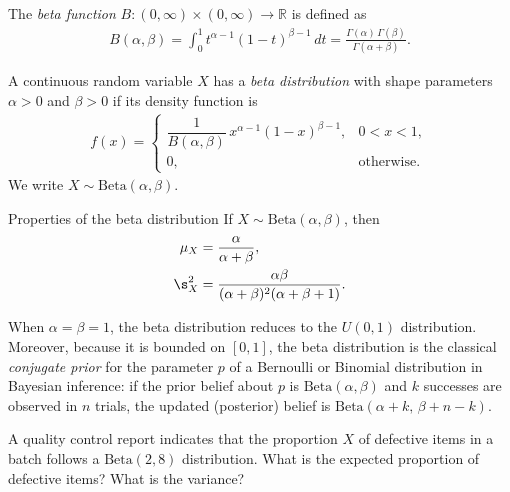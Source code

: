 \begin{definicion}
The \emph{beta function} $B: (0,\infty)\times(0,\infty) \to \mathbb{R}$ is defined as
\begin{align}
 \label{eq:2.8.16}
 B(\alpha,\beta) = \int_0^1 t^{\alpha-1}(1-t)^{\beta-1}\,dt
 = \frac{\Gamma(\alpha)\,\Gamma(\beta)}{\Gamma(\alpha+\beta)}.
\end{align}
\end{definicion}

\begin{definicion}
A continuous random variable $X$ has a \emph{beta distribution} with shape parameters
$\alpha > 0$ and $\beta > 0$ if its density function is
\begin{align}
 \label{eq:2.8.17}
 f(x) =
 \begin{cases}
  \dfrac{1}{B(\alpha,\beta)}\,x^{\alpha-1}(1-x)^{\beta-1}, & 0 < x < 1, \\
  0, & \text{otherwise.}
 \end{cases}
\end{align}
We write $X \sim \text{Beta}(\alpha,\beta)$.
\end{definicion}

{Properties of the beta distribution} If $X \sim \text{Beta}(\alpha,\beta)$, then
\begin{align}
 \mu_X &= \frac{\alpha}{\alpha+\beta}, \\
 \s_X^2 &= \frac{\alpha\beta}{(\alpha+\beta)^2(\alpha+\beta+1)}.
\end{align}

\begin{observacion}
When $\alpha=\beta=1$, the beta distribution reduces to the $U(0,1)$ distribution.
Moreover, because it is bounded on $[0,1]$, the beta distribution is the classical
\emph{conjugate prior} for the parameter $p$ of a Bernoulli or Binomial distribution in
Bayesian inference: if the prior belief about $p$ is $\text{Beta}(\alpha,\beta)$ and $k$
successes are observed in $n$ trials, the updated (posterior) belief is
$\text{Beta}(\alpha+k,\, \beta+n-k)$.
\end{observacion}

\begin{ejemplo}
 \label{exmp:2.8.7}
A quality control report indicates that the proportion $X$ of defective items in a batch
follows a $\text{Beta}(2,8)$ distribution. What is the expected proportion of defective
items? What is the variance?
\end{ejemplo}

